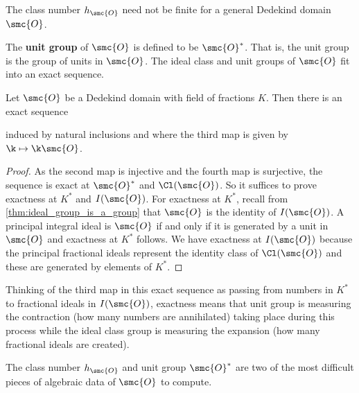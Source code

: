     \begin{remark}\label{rem:general_class_number_not_finite}
      The class number \(h_{\smc{O}}\) need not be finite for a general Dedekind domain \(\smc{O}\).
    \end{remark}
    
    The \textbf{unit group} of \(\smc{O}\) is defined to be \(\smc{O}^{\ast}\). That is, the unit group is the group of units in \(\smc{O}\). The ideal class and unit groups of \(\smc{O}\) fit into an exact sequence.

    \begin{proposition}\label{prop:ideal_class_group_exact_sequence}
      Let \(\smc{O}\) be a Dedekind domain with field of fractions \(K\). Then there is an exact sequence
      \begin{center}
      \end{center}
      induced by natural inclusions and where the third map is given by \(\k \mapsto \k\smc{O}\).
    \end{proposition}
    \begin{proof}
      As the second map is injective and the fourth map is surjective, the sequence is exact at \(\smc{O}^{\ast}\) and \(\Cl(\smc{O})\). So it suffices to prove exactness at \(K^{\ast}\) and \(I(\smc{O})\). For exactness at \(K^{\ast}\), recall from \cref{thm:ideal_group_is_a_group} that \(\smc{O}\) is the identity of \(I(\smc{O})\). A principal integral ideal is \(\smc{O}\) if and only if it is generated by a unit in \(\smc{O}\) and exactness at \(K^{\ast}\) follows. We have exactness at \(I(\smc{O})\) because the principal fractional ideals represent the identity class of \(\Cl(\smc{O})\) and these are generated by elements of \(K^{\ast}\).
    \end{proof}

    Thinking of the third map in this exact sequence as passing from numbers in \(K^{\ast}\) to fractional ideals in \(I(\smc{O})\), exactness means that unit group is measuring the contraction (how many numbers are annihilated) taking place during this process while the ideal class group is measuring the expansion (how many fractional ideals are created).
    
    \begin{remark}
      The class number \(h_{\smc{O}}\) and unit group \(\smc{O}^{\ast}\) are two of the most difficult pieces of algebraic data of \(\smc{O}\) to compute.
    \end{remark}

